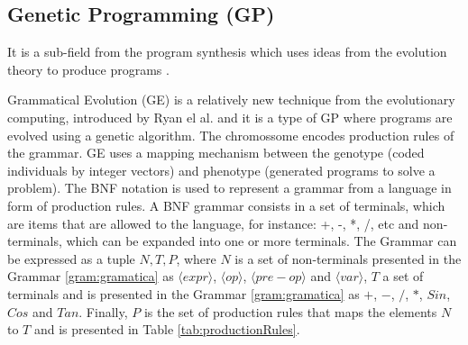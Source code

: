 \documentclass[conference]{IEEEtran}
\begin{document}
\subsection{Genetic Programming {(GP)}}
\label{sec:geneticprogamming}
 It is a sub-field from the program synthesis which uses ideas from the evolution theory to produce programs \cite{koza1992genetic}. 



Grammatical Evolution (GE) is a relatively new technique from the evolutionary computing, introduced by Ryan el al. \cite{ryan1998grammatical} and it is a type of GP where programs are evolved using a genetic algorithm. The chromossome encodes production rules of the grammar. GE uses a mapping mechanism between the genotype (coded individuals by integer vectors) and phenotype (generated programs to solve a problem). The BNF notation is used to represent a grammar from a language in form of production rules. A BNF grammar consists in a set of terminals, which are items that are allowed to the language, for instance: +, -, *, /, etc and non-terminals, which can be expanded into one or more terminals. The Grammar can be expressed as a tuple ${N,T,P}$, where $N$ is a set of non-terminals presented in the Grammar \ref{gram:gramatica} as $\langle expr \rangle$, $\langle op \rangle$, $\langle pre - op \rangle$ and $\langle var \rangle$,  $T$ a set of terminals and is presented in the Grammar \ref{gram:gramatica} as $+$, $-$, $/$, $*$, $Sin$, $Cos$ and $Tan$. Finally, $P$ is the set of production rules that maps the elements $N$ to $T$ and is presented in Table \ref{tab:productionRules}.



%
%
\end{document}
